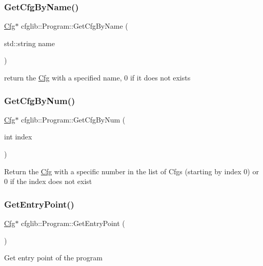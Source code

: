 \subsubsection{\texorpdfstring{Get\+Cfg\+By\+Name()}{GetCfgByName()}}
{\footnotesize\ttfamily \hyperlink{classcfglib_1_1Cfg}{Cfg}$\ast$ cfglib\+::\+Program\+::\+Get\+Cfg\+By\+Name (\begin{DoxyParamCaption}\item[{std\+::string}]{name }\end{DoxyParamCaption})}

return the \hyperlink{classcfglib_1_1Cfg}{Cfg} with a specified name, 0 if it does not exists \mbox{\label{classcfglib_1_1Program_a35902ab795a8defb794e0db1ececdf54}} 
\subsubsection{\texorpdfstring{Get\+Cfg\+By\+Num()}{GetCfgByNum()}}
{\footnotesize\ttfamily \hyperlink{classcfglib_1_1Cfg}{Cfg}$\ast$ cfglib\+::\+Program\+::\+Get\+Cfg\+By\+Num (\begin{DoxyParamCaption}\item[{int}]{index }\end{DoxyParamCaption})}

Return the \hyperlink{classcfglib_1_1Cfg}{Cfg} with a specific number in the list of Cfgs (starting by index 0) or 0 if the index does not exist \mbox{\label{classcfglib_1_1Program_a9223048335b62778f7823825a842d0da}} 
\subsubsection{\texorpdfstring{Get\+Entry\+Point()}{GetEntryPoint()}}
{\footnotesize\ttfamily \hyperlink{classcfglib_1_1Cfg}{Cfg}$\ast$ cfglib\+::\+Program\+::\+Get\+Entry\+Point (\begin{DoxyParamCaption}{ }\end{DoxyParamCaption})}

Get entry point of the program \mbox{\label{classcfglib_1_1Program_acc4f72ffe5f628e35b0f063d4c3f9e9d}} 
